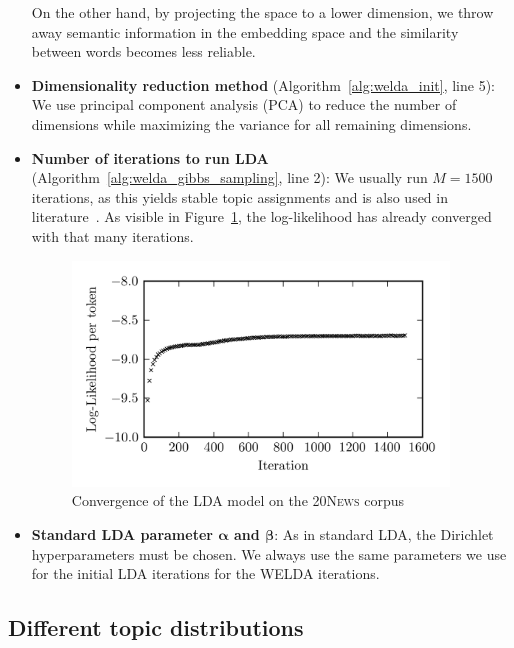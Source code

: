 \documentclass[
        a4paper,
        titlepage,
        twoside,
        parskip,
        numbers=noenddot
        ]{scrbook}
\theoremstyle{break}
\begin{document}
\begin{itemize}
    On the other hand, by projecting the space to a lower dimension, we throw away semantic information in the embedding space and the similarity between words becomes less reliable.
  \item \textbf{Dimensionality reduction method} (Algorithm~\ref{alg:welda_init}, line 5):
    We use principal component analysis (PCA) to reduce the number of dimensions while maximizing the variance for all remaining dimensions.
  \item \textbf{Number of iterations to run LDA} (Algorithm~\ref{alg:welda_gibbs_sampling}, line 2):
    We usually run $M = 1500$ iterations, as this yields stable topic assignments and is also used in literature~\cite{Nguyen2015}.
    As visible in Figure~\ref{fig:ll_lda_convergence}, the log-likelihood has already converged with that many iterations.
    \begin{figure}
           \centering
           \includegraphics[width=10cm]{figures/ll_lda_convergence.png}
           \caption{Convergence of the LDA model on the \textsc{20News} corpus}
           \label{fig:ll_lda_convergence}
    \end{figure}
  \item \textbf{Standard LDA parameter $\boldsymbol{\alpha}$ and $\boldsymbol{\beta}$}:
    As in standard LDA, the Dirichlet hyperparameters must be chosen.
    We always use the same parameters we use for the initial LDA iterations for the WELDA iterations.
\end{itemize}

\subsection{Different topic distributions}
\end{document}

